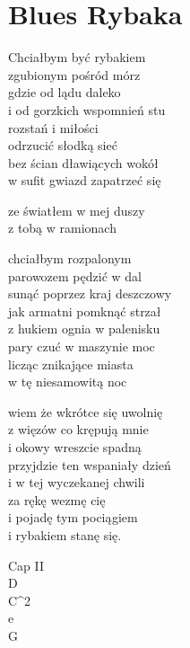 \section{Blues Rybaka}
\begin{text}
    \hfill\break
    Chciałbym być rybakiem\\
    zgubionym pośród mórz\\
    gdzie od lądu daleko\\
    i od gorzkich wspomnień stu\\
    rozstań i miłości\\
    odrzucić słodką sieć\\
    bez ścian dławiących wokół\\
    w sufit gwiazd zapatrzeć się

    ze światłem w mej duszy\\
    z tobą w ramionach

    chciałbym rozpalonym\\
    parowozem pędzić w dal\\
    sunąć poprzez kraj deszczowy\\
    jak armatni pomknąć strzał\\
    z hukiem ognia w palenisku\\
    pary czuć w maszynie moc\\
    licząc znikające miasta\\
    w tę niesamowitą noc

    wiem że wkrótce się uwolnię\\
    z więzów co krępują mnie\\
    i okowy wreszcie spadną\\
    przyjdzie ten wspaniały dzień\\
    i w tej wyczekanej chwili\\
    za rękę wezmę cię\\
    i pojadę tym pociągiem\\
    i rybakiem stanę się.
\end{text}
\begin{chord}
    Cap II\\
    D\\
    C^2\\
    e\\
    G
\end{chord}